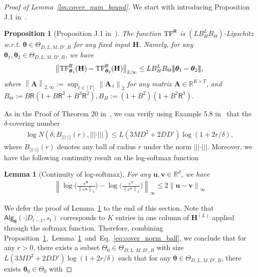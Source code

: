 \documentclass[10pt]{article}
\newtheorem{lemma}[theorem]{Lemma}
\newtheorem{proposition}[theorem]{Proposition}
\newcommand{\norm}[1]{\left\|{#1}\right\|}
\newcommand{\lone}[1]{\norm{#1}_1}
\newcommand{\ltwo}[1]{\norm{#1}_2}
\newcommand{\ltwop}[2]{\norm{#1}_{2,{#2}}}
\newcommand{\linf}[1]{\norm{#1}_\infty}
\newcommand{\normbig}[1]{\big\|{#1}\big\|}
\newcommand{\ltwopbig}[2]{\normbig{#1}_{2,{#2}}}
\newcommand{\<}{\left\langle}
\renewcommand{\>}{\right\rangle}
\newcommand{\TF}{{\rm TF}}
\newcommand{\nrmp}[1]{{\left|\!\left|\!\left|{#1}\right|\!\right|\!\right|}}
\newcommand{\R}{\mathbb{R}}
\newcommand{\state}{{s}}
\newcommand{\sAlg}{{\mathsf{Alg}}}
\newcommand{\dset}{{D}}
\newcommand{\tfpar}{{\btheta}}
\newcommand{\tfparspace}{{\Theta}}
\newcommand{\layer}{{L}}
\newcommand{\hidden}{{D'}}
\newcommand{\head}{{M}}
\newcommand{\normb}{{B}}
\newcommand{\clipval}{{\mathsf{R}}}
\newcommand{\tfmat}{{\bH}}
\newcommand{\embd}{{D}}
\newcommand{\actnum}{{K}}
\def\bA{{\mathbf A}}
\def\bH{{\mathbf H}}
\def\btheta{{\boldsymbol \theta}}
\def\bu{{\mathbf u}}
\def\bv{{\mathbf v}}
\begin{document}
\begin{proof}[Proof of Lemma~\ref{lm:cover_num_bound}]
We start with introducing Proposition J.1 in~\cite{bai2023transformers}.
\begin{proposition}[Proposition J.1 in~\cite{bai2023transformers}]\label{prop:bai_j1}
The function $\TF^\clipval$ is $(\layer\normb^{\layer}_{H}\normb_{\Theta})$-Lipschitz w.r.t. $\tfpar\in\tfparspace_{D, \layer,\head,\hidden,\normb}$ for any fixed input $\tfmat$. Namely, for any $\tfpar_1,\tfpar_2\in\tfparspace_{D, \layer,\head,\hidden,\normb}$, we have
\begin{align*}
    \ltwopbig{\TF^\clipval_{\tfpar_1}(\tfmat)-\TF^\clipval_{\tfpar_2}(\tfmat)}{\infty}\leq \layer\normb^{\layer}_{H}\normb_{\Theta}\nrmp{\tfpar_1-\tfpar_2},
\end{align*}
where $\ltwop{\bA}{\infty}:=\sup_{t\in[T]}\ltwo{\bA_{\cdot t}}$  for any matrix $\bA\in\R^{K\times T}$, and $\normb_\Theta:=\normb\clipval(1+\normb\clipval^2+\normb^3\clipval^2),\normb_H:=(1+\normb^2)(1+\normb^2\clipval^3)$.
\end{proposition}
As in the Proof of Theorem 20 in~\cite{bai2023transformers}, we can verify using Example 5.8 in~\cite{wainwright2019high} that the $\delta$-covering number
\begin{align}\log N(\delta;\normb_{\nrmp{\cdot}}(r),\nrmp{\cdot})\leq \layer(3\head\embd^2+2\embd\hidden)\log(1+2r/\delta),\label{eq:cover_norm_ball}
\end{align}where $\normb_{\nrmp{\cdot}}(r)$ denotes any ball of radius $r$ under the norm $\nrmp{\cdot}$.  Moreover, we have the following continuity result on the log-softmax function
\begin{lemma}[Continuity of log-softmax]\label{lm:log_softmax}
    For any $\bu,\bv\in\R^d$, we have
    \begin{align*}
    \linf{\log \Big(\frac{e^\bu}{\lone{e^\bu}}\Big)-\log \Big(\frac{e^\bv}{\lone{e^\bv}}\Big)}\leq 2\linf{\bu-\bv}
    \end{align*}
\end{lemma}
We defer the proof of Lemma~\ref{lm:log_softmax} to the end of this section.
Note that  $\sAlg_{\tfpar}(\cdot|\dset_{t-1},\state_t)$ corresponds to $\actnum$ entries in one column of $\tfmat^{(\layer)}$ applied  through the softmax function. Therefore, combining Proposition~\ref{prop:bai_j1},~Lemma~\ref{lm:log_softmax}~and~Eq.~\eqref{eq:cover_norm_ball}, we conclude that for any $r>0$, there exists a subset $\tfparspace_0\in\tfparspace_{D, \layer,\head,\hidden,\normb}$ with size $\layer(3\head\embd^2+2\embd\hidden)\log(1+2r/\delta)$ such that for any $\tfpar\in\tfparspace_{D, \layer,\head,\hidden,\normb}$, there exists $\tfpar_0\in\tfparspace_0$ with

\end{proof}
\end{document}
